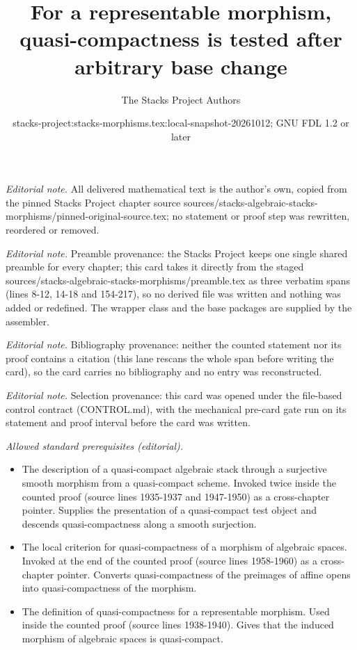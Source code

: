 \documentclass[10pt,a4paper]{amsart}
\title{For a representable morphism, quasi-compactness is tested after arbitrary base change}
\author{The Stacks Project Authors}
\date{stacks-project:stacks-morphisms.tex:local-snapshot-20261012; GNU FDL 1.2 or later}
\theoremstyle{plain}
\theoremstyle{definition}
\theoremstyle{remark}
\numberwithin{equation}{subsection}
\begin{document}
\maketitle
\noindent\textit{Editorial note.} All delivered mathematical text is the author's own, copied from the pinned Stacks Project chapter source sources/stacks-algebraic-stacks-morphisms/pinned-original-source.tex; no statement or proof step was rewritten, reordered or removed.\par\medskip
\noindent\textit{Editorial note.} Preamble provenance: the Stacks Project keeps one single shared preamble for every chapter; this card takes it directly from the staged sources/stacks-algebraic-stacks-morphisms/preamble.tex as three verbatim spans (lines 8-12, 14-18 and 154-217), so no derived file was written and nothing was added or redefined. The wrapper class and the base packages are supplied by the assembler.\par\medskip
\noindent\textit{Editorial note.} Bibliography provenance: neither the counted statement nor its proof contains a citation (this lane rescans the whole span before writing the card), so the card carries no bibliography and no entry was reconstructed.\par\medskip
\noindent\textit{Editorial note.} Selection provenance: this card was opened under the file-based control contract (CONTROL.md), with the mechanical pre-card gate run on its statement and proof interval before the card was written.\par\medskip
\noindent\textit{Allowed standard prerequisites (editorial).}\begin{itemize}
\item The description of a quasi-compact algebraic stack through a surjective smooth morphism from a quasi-compact scheme. Invoked twice inside the counted proof (source lines 1935-1937 and 1947-1950) as a cross-chapter pointer. Supplies the presentation of a quasi-compact test object and descends quasi-compactness along a smooth surjection.
\item The local criterion for quasi-compactness of a morphism of algebraic spaces. Invoked at the end of the counted proof (source lines 1958-1960) as a cross-chapter pointer. Converts quasi-compactness of the preimages of affine opens into quasi-compactness of the morphism.
\item The definition of quasi-compactness for a representable morphism. Used inside the counted proof (source lines 1938-1940). Gives that the induced morphism of algebraic spaces is quasi-compact.
\end{itemize}\medskip
\end{document}
